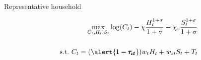 \documentclass[11pt,aspectratio=169]{beamer}
\begin{document}
\begin{frame}{Representative household}
\hypertarget{backhh}{}
\vspace{2mm}
\begin{minipage}[t!]{1\textwidth}
	\begin{align*}
		\max_{C_t, H_{t}, S_{t}} \log(C_t)-\chi\frac{H_{t}^{1+\sigma}}{1+\sigma}-\chi_s\frac{S_{t}^{1+\sigma}}{1+\sigma}
		\\
		\vspace{4mm}
		\\
		\text{s.t.}\ C_t=(\alert{\pmb{1-\tau_{\iota t}}})w_{t}H_{t}+w_{st}S_t+T_t%
	\end{align*}
\end{minipage}


\end{frame}
\end{document}

